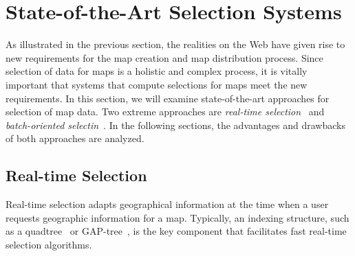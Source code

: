 \documentclass[11pt, oneside]{report}
\newcommand{\minisec}[1]{\noindent\textbf{#1.}}
\begin{document}
{%


\section{State-of-the-Art Selection Systems}
\label{sec:introduction:architectures}
As illustrated in the previous section, the realities on the Web have given rise to new requirements for the map creation and map distribution process. Since selection of data for maps is a holistic and complex process, it is vitally important that systems that compute selections for maps meet the new requirements. In this section, we will examine state-of-the-art approaches for selection of map data. Two extreme approaches are \emph{real-time selection}~\cite{bereuter2013real,van1995gap} and \emph{batch-oriented selectin}~\cite{sarma2012fusiontables,frank1994multiscaletree,van2011towards}. In the following sections, the advantages and drawbacks of both approaches are analyzed.

\subsection{Real-time Selection}
Real-time selection adapts geographical information at the time when a user requests geographic information for a map. Typically, an indexing structure, such as a quadtree~\cite{bereuter2013real} or GAP-tree~\cite{van1995gap}, is the key component that facilitates fast real-time selection algorithms.

}
\end{document}
